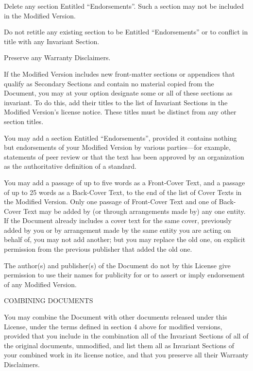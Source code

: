 \item
Delete any section Entitled ``Endorsements''.  Such a section may not be included in the Modified Version.

\item
Do not retitle any existing section to be Entitled ``Endorsements'' or to conflict in title with any Invariant Section.

\item
Preserve any Warranty Disclaimers.
\stopitemize

If the Modified Version includes new front-matter sections or appendices that qualify as Secondary Sections and contain no material copied from the Document, you may at your option designate some or all of these sections as invariant.  To do this, add their titles to the list of Invariant Sections in the Modified Version's license notice. These titles must be distinct from any other section titles.

You may add a section Entitled ``Endorsements'', provided it contains nothing but endorsements of your Modified Version by various parties---for example, statements of peer review or that the text has been approved by an organization as the authoritative definition of a standard.

You may add a passage of up to five words as a Front-Cover Text, and a passage of up to 25 words as a Back-Cover Text, to the end of the list of Cover Texts in the Modified Version.  Only one passage of Front-Cover Text and one of Back-Cover Text may be added by (or through arrangements made by) any one entity.  If the Document already includes a cover text for the same cover, previously added by you or by arrangement made by the same entity you are acting on behalf of, you may not add another; but you may replace the old one, on explicit permission from the previous publisher that added the old one.

The author(s) and publisher(s) of the Document do not by this License give permission to use their names for publicity for or to assert or imply endorsement of any Modified Version.

\item
COMBINING DOCUMENTS

You may combine the Document with other documents released under this License, under the terms defined in section 4 above for modified versions, provided that you include in the combination all of the Invariant Sections of all of the original documents, unmodified, and list them all as Invariant Sections of your combined work in its license notice, and that you preserve all their Warranty Disclaimers.

